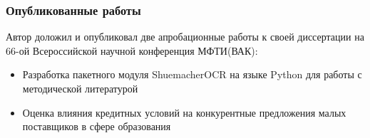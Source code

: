 
\begin{frame}
    \frametitle{Опубликованные работы}	
    Автор доложил и опубликовал две апробационные работы к своей диссертации на 66-ой Всероссийской научной конференция МФТИ(ВАК):  
    \begin{itemize}
        \item Разработка пакетного модуля ShuemacherOCR на языке Python
        для работы с методической литературой
        \item Оценка влияния кредитных условий на конкурентные предложения малых поставщиков в сфере образования
    \end{itemize}
\end{frame}